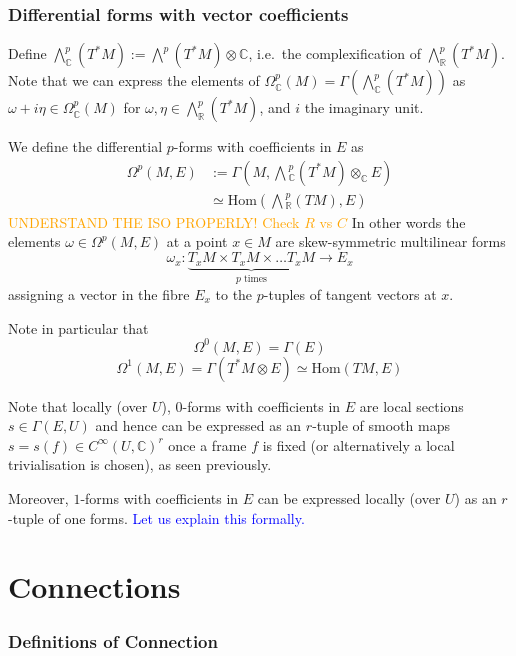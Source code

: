 \documentclass[a4paper]{article}
\theoremstyle{definition} \newtheorem*{definition}{Definition}
\theoremstyle{definition} \newtheorem*{definitions}{Definitions}
\theoremstyle{plain} \newtheorem{theorem}{Theorem}[section]
\theoremstyle{plain} \newtheorem{proposition}[theorem]{Proposition}
\theoremstyle{plain} \newtheorem{corollary}[theorem]{Corollary}
\theoremstyle{plain} \newtheorem{lemma}[theorem]{Lemma}
\theoremstyle{plain} \newtheorem{example}[theorem]{Example}
\newcommand{\understandBetter}[1]{\textcolor{orange}{#1}}
\newcommand{\explainFurther}[1]{\textcolor{blue}{#1}}
\newcommand{\realnos}{\mathbb{R}}
\newcommand{\complexnos}{\mathbb{C}}
\newcommand{\smoothCmaps}{C^\infty (U, \complexnos)}
\newcommand{\Hom}{\text{Hom}}
\begin{document}
\subsubsection{Differential forms with vector coefficients}
Define $\bigwedge^p_\complexnos(T^\ast M):=\bigwedge^p (T^\ast M)\otimes \complexnos$, i.e.\ the complexification of $\bigwedge^p_\realnos(T^\ast M)$. Note that we can express the elements of $\Omega^p_\complexnos(M)=\Gamma(\bigwedge^p_\complexnos(T^\ast M))$ as $\omega+i\eta \in \Omega^p_\complexnos(M)$ for $\omega, \eta \in \bigwedge^p_\realnos(T^\ast M)$, and $i$ the imaginary unit. 

We define the differential $p$-forms with coefficients in $E$ as 
\begin{align*}
\Omega^p(M, E) & :=\Gamma(M, \bigwedge {}^p_\complexnos(T^\ast M) \otimes_\complexnos E) \\
& \simeq \Hom(\bigwedge {}^p_\realnos (TM), E)
\end{align*}
\understandBetter{UNDERSTAND THE ISO PROPERLY! Check $R$ vs $C$}
In other words the elements $\omega\in \Omega^p(M, E)$ at a point $x\in M$ are skew-symmetric multilinear forms 
$$\omega_x:\underbrace{T_xM\times T_xM\times \ldots T_xM}_{p \text{ times}} \to E_x$$
assigning a vector in the fibre $E_x$ to the $p$-tuples of tangent vectors at $x$. 

Note in particular that 
$$\Omega^0(M, E) = \Gamma(E)$$
$$\Omega^1(M, E) = \Gamma(T^\ast M \otimes E) \simeq \Hom(TM, E)$$

Note that locally (over $U$),  $0$-forms with coefficients in $E$ are local sections $s\in \Gamma(E, U)$ and hence can be expressed as an $r$-tuple of smooth maps $s=s(f)\in \smoothCmaps^r$ once a frame $f$ is fixed (or alternatively a local trivialisation is chosen),  as seen previously.  

Moreover,  $1$-forms with coefficients in $E$ can be expressed locally (over $U$) as an $r$-tuple of one forms.  \explainFurther{Let us explain this formally. }

\section{Connections}

\subsubsection{Definitions of Connection}
\end{document}
